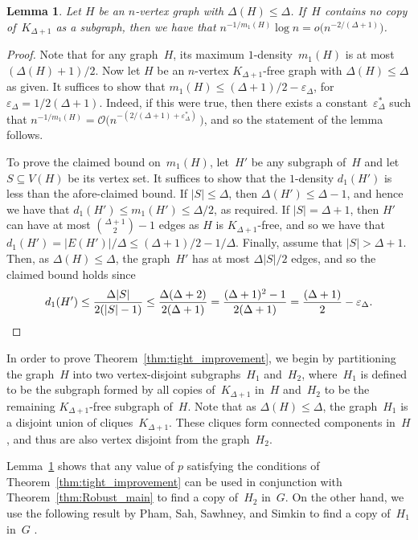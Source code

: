 \documentclass[final]{article}
\def\mcite[#1]#2{\mbox{\cite[#1]{#2}}}
\newtheorem{lemma}[theorem]{Lemma}
\theoremstyle{definition}
\newcommand{\eps}{\varepsilon}
\newcommand{\bigO}{\mathcal{O}}
\begin{document}
\begin{lemma}
\label{lem:suplementary}
    Let $H$ be an $n$-vertex graph with $\Delta(H) \leq \Delta$. If~$H$ contains no copy of~$K_{\Delta+1}$ as a subgraph, then we have that $n^{-1/m_1(H)}\log n = o\bigl(n^{-2/(\Delta+1)}\bigr)$. 
\end{lemma}
\begin{proof}
   Note that for any graph~$H$, its maximum $1$-density~$m_1(H)$ is at most $(\Delta(H) +1)/2$. Now let $H$ be an $n$-vertex $K_{\Delta+1}$-free graph with $\Delta(H) \leq \Delta$ as given. It suffices to show that $m_1(H) \leq (\Delta+1)/2 - \eps_{\Delta}$, for  $\eps_{\Delta} = 1/2(\Delta+1)$. Indeed, if this were true, then there exists a constant~$\eps_{\Delta}^*$ such that $n^{-1/m_1(H)} = \bigO\bigl(n^{-(2/(\Delta+1) + \eps_{\Delta}^*)}\,\bigr)$, and so the statement of the lemma follows.  

    To prove the claimed bound on~$m_1(H)$, let~$H'$ be any subgraph of~$H$ and let $S \subseteq V(H)$ be its vertex set. 
    It suffices to show that the $1$-density $d_1(H')$ is less than the afore-claimed bound. 
    If $|S| \leq \Delta$, then $\Delta(H') \leq \Delta-1$, and hence we have that $d_1(H') \leq m_1(H') \leq \Delta/2$, as required. 
    If $|S| = \Delta+1$, then $H'$ can have at most $\binom{\Delta+1}{2} -1$ edges as $H$ is $K_{\Delta+1}$-free, and so we have that $d_1(H') = |E(H')|/\Delta \leq (\Delta+1)/2 - 1/\Delta$. 
    Finally, assume that $|S| > \Delta+1$. Then, as $\Delta(H) \leq \Delta$, the graph~$H'$ has at most $\Delta|S|/2$ edges, and so the claimed bound holds since 
    \[d_1(H') \leq \frac{\Delta|S|}{2(|S|-1)} \leq \frac{\Delta(\Delta+2)}{2(\Delta+1)} = \frac{(\Delta+1)^2 - 1}{2(\Delta+1)} = \frac{(\Delta+1)}2 - \eps_{\Delta}. \qedhere\] 
    \end{proof}

In order to prove Theorem~\ref{thm:tight_improvement}, we begin by partitioning the graph~$H$ into two vertex-disjoint subgraphs~$H_1$ and~$H_2$, where~$H_1$ is defined to be the subgraph formed by all copies of~$K_{\Delta+1}$ in~$H$ and~$H_2$ to be the remaining $K_{\Delta+1}$-free subgraph of~$H$. Note that as $\Delta(H) \leq \Delta$, the graph~$H_1$ is a disjoint union of cliques~$K_{\Delta+1}$. These cliques form connected components in~$H$, and thus are also vertex disjoint from the graph~$H_2$. 

Lemma~\ref{lem:suplementary} shows that any value of $p$ satisfying the conditions of Theorem~\ref{thm:tight_improvement} can be used in conjunction with Theorem~\ref{thm:Robust_main} to find a copy of~$H_2$ in~$G$. On the other hand, we use the following result by Pham, Sah, Sawhney, and Simkin to find a copy of~$H_1$ in~$G$ \mcite[Theorem 1.7 (2)]{toolkit_robust_thresholds}. 
\end{document}

